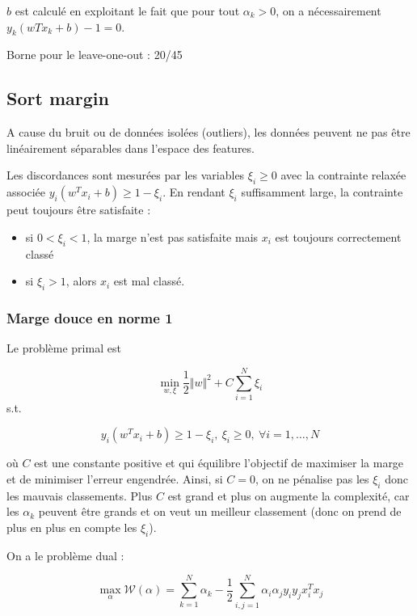	$b$ est calculé en exploitant le fait que pour tout $\alpha_k > 0$, on a nécessairement $y_k(wTx_k + b) - 1 = 0$.
	
	Borne pour le leave-one-out : 20/45
	
	\subsection{Sort margin}
	
	A cause du bruit ou de données isolées (outliers), les données peuvent ne pas être linéairement séparables dans l'espace des features. 
	
	
	Les discordances sont mesurées par les variables $\xi_i \geq 0$ avec la contrainte relaxée associée $y_i(w^Tx_i + b) \geq 1 - \xi_i$. En rendant $\xi_i$ suffisamment large, la contrainte peut toujours être satisfaite :
	
	\begin{itemize}
		\item si $0 < \xi_i < 1$, la marge n'est pas satisfaite mais $x_i$ est toujours correctement classé
		\item si $\xi_i > 1$, alors $x_i$ est mal classé.
	\end{itemize}
	
	\subsubsection{Marge douce en norme 1}
	
	Le problème primal est
	
	$$\min_{w, \xi} \frac{1}{2} \Vert w \Vert^2 + C \sum_{i = 1}^N \xi_i$$
	s.t.
	
	$$y_i(w^T x_i + b) \geq 1 - \xi_i, \: \xi_i \geq 0, \: \forall i = 1, \dots , N$$
	
	où $C$ est une constante positive et qui équilibre l'objectif de maximiser la marge et de minimiser l'erreur engendrée. Ainsi, si $C = 0$, on ne pénalise pas les $\xi_i$ donc les mauvais classements. Plus $C$ est grand et plus on augmente la complexité, car les $\alpha_k$ peuvent être grands et on veut un meilleur classement (donc on prend de plus en plus en compte les $\xi_i$).
	
	
	On a le problème dual :
	
	$$\max_\alpha \mathcal{W}(\alpha) = \sum_{k = 1}^N \alpha_k - \frac{1}{2} \sum_{i, j = 1}^N \alpha_i \alpha_j y_i y_j x_i^T x_j$$
	
